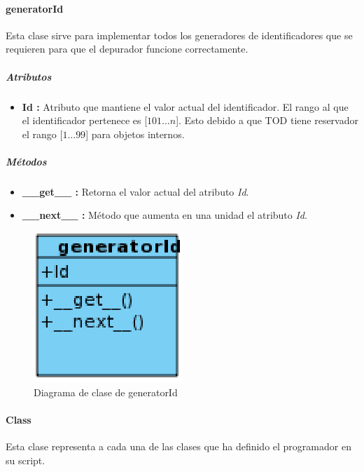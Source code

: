 \documentclass[12pt,legalpaper]{report}
\begin{document}
					
				\paragraph{generatorId}

Esta clase sirve para implementar todos los generadores de identificadores que se requieren para que el depurador funcione correctamente.

					\subparagraph{Atributos}

\begin{itemize}
	\item \textbf{Id :} Atributo que mantiene el valor actual del identificador.  El rango al que el identificador pertenece es [$101 \dots n$].  Esto debido a que TOD tiene reservador el rango [$1 \dots 99$] para objetos internos.
\end{itemize}					
					
					\subparagraph{Métodos}						

\begin{itemize}
	\item \textbf{\_\_get\_\_ :} Retorna el valor actual del atributo \textit{Id}.
	\item \textbf{\_\_next\_\_ :} Método que aumenta en una unidad el atributo \textit{Id}.
\end{itemize}					

					
\begin{figure}[!ht]
	\centering
	\includegraphics[scale=0.6]{images/Clases/generatorId.eps}
	\caption{Diagrama de clase de generatorId}
\end{figure}
					
				\paragraph{Class}
				
Esta clase representa a cada una de las clases que ha definido el programador en su script.				
				
\end{document}
